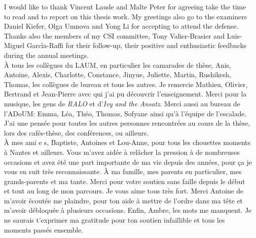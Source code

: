 I would like to thank Vincent Laude and Malte Peter for agreeing take the time to read and to report on this thesis work. My greetings also go to the examiners Daniel Kiefer, Olga Umnova and Yong Li for accepting to attend the defense. Thanks also the members of my CSI committee, Tony Valier-Brasier and Luis-Miguel Garc\`ia-Raffi for their follow-up, their positive and enthusiastic feedbacks during the annual meetings. \\

À tous les collègues du LAUM, en particulier les camarades de thèse, Anis, Antoine, Alexis, Charlotte, Constance, Jinyue, Juliette, Martin, Rushikesh, Thomas, les collègues de bureau et tous les autres. Je remercie Mathieu, Olivier, Bertrand et Jean-Pierre avec qui j'ai pu découvrir l'enseignement. Merci pour la musique, les gens de \emph{RALO} et d'\emph{Ivy and the Ansatz}. Merci aussi au bureau de l'ADoUM: Emma, Léa, Théo, Thomas, Sofyane ainsi qu'à l'équipe de l'escalade. J'ai une pensée pour toutes les autres personnes rencontrées au cours de la thèse, lors des cafés-thèse, des conférences, ou ailleurs. \\

À mes ami \medpt e \medpt s, Baptiste, Antoines et Lou-Anne, pour tous les chouettes moments à Nantes et ailleurs. Vous m'avez aidée à relâcher la pression à de nombreuses occasions et avez été une part importante de ma vie depuis des années, pour ça je vous en suit très reconnaissante. À ma famille, mes parents en particulier, mes grands-parents et ma tante. Merci pour votre soutien sans faille depuis le début et tout au long de mon parcours. Je vous aime tous très fort. Merci Antoine de m'avoir écoutée me plaindre, pour ton aide à mettre de l'ordre dans ma tête et m'avoir débloquée à plusieurs occasions. Enfin, Ambre, les mots me manquent. Je ne saurais t'exprimer ma gratitude pour ton soutien infaillible et tous les moments passés ensemble.